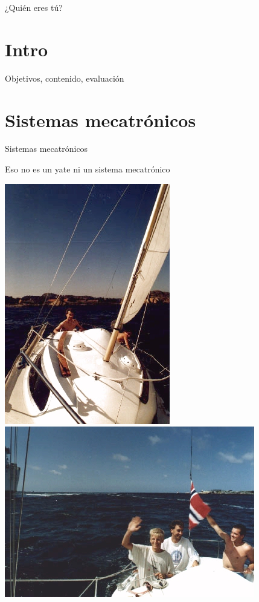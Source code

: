 \documentclass[presentation,aspectratio=169]{beamer}
\begin{document}
\begin{frame}[label={sec:org688f669}]{¿Quién eres tú?}
\end{frame}


\section{Intro}
\label{sec:org42f4eb1}
\begin{frame}[label={sec:org142dcc0}]{Objetivos, contenido, evaluación}
\end{frame}


\section{Sistemas mecatrónicos}
\label{sec:org5e0ed1a}

\begin{frame}[label={sec:org964dcc9}]{Sistemas mecatrónicos}
\end{frame}

\begin{frame}[label={sec:org131ea02}]{Eso \alert{no} es un yate \alert{ni} un sistema mecatrónico}
\begin{center}
\includegraphics[height=0.6\textheight]{../../figures/red-heat-1.jpeg}
\includegraphics[height=0.6\textheight]{../../figures/red-heat-2.jpeg}
\end{center}
\end{frame}
\end{document}
